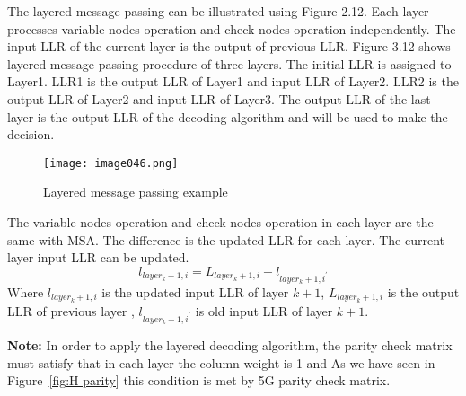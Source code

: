 The layered message passing can be illustrated using Figure 2.12. Each layer processes variable nodes operation and check nodes operation independently. The input LLR of the current layer is the output of previous LLR. Figure 3.12 shows layered message passing procedure of three layers. The initial LLR is assigned to Layer1. LLR1 is the output LLR of Layer1 and input LLR of Layer2. LLR2 is the output LLR of Layer2 and input LLR of Layer3. The output LLR of the last layer is the output LLR of the decoding algorithm and will be used to make the decision.
\begin{figure}[ht]
    \centering
    \texttt{[image: image046.png]}
    \caption{Layered message passing example }
    \label{fig:Layered message passing example }
\end{figure}
The variable nodes operation and check nodes operation in each layer are the same with  MSA. The diﬀerence is the updated LLR for each layer. The current layer input LLR can be updated.
\[ l_{layer_k+1,i}=L_{layer_k+1,i}-l_{layer_k+1,i^\prime} \]
Where $l_{layer_k+1,i}$ is the updated input LLR of layer $k+1$, $L_{layer_k+1,i}$ is the output LLR of previous layer , $l_{layer_k+1,i^\prime}$ is old input LLR of layer $k+1$.\\
\begin{GrayBox}
    \textbf{Note:} In order to apply the layered decoding algorithm, the parity check matrix must satisfy that in each layer the column weight is 1 and As we have seen in Figure~\ref{fig:H parity} this condition is met by 5G parity check matrix.
\end{GrayBox}
